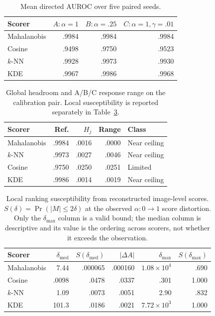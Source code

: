 \documentclass[pdflatex,sn-basic]{sn-jnl}
\theoremstyle{plain}
\theoremstyle{definition}
\theoremstyle{remark}
\begin{document}
\begin{table}[t]
\centering
\caption{Mean directed AUROC over five paired seeds.}
\label{tab:rq3}
\small
\begin{tabular}{lrrr}
\toprule
Scorer & $A:\alpha=1$ & $B:\alpha=.25$ & $C:\alpha=1,\gamma=.01$\\
\midrule
Mahalanobis & .9984 & .9984 & .9984\\
Cosine & .9498 & .9750 & .9523\\
$k$-NN & .9928 & .9973 & .9930\\
KDE & .9967 & .9986 & .9968\\
\bottomrule
\end{tabular}
\end{table}

\begin{table}[t]
\centering
\caption{Global headroom and A/B/C response range on the calibration pair. Local susceptibility is reported separately in Table~\ref{tab:susceptibility}.}
\label{tab:headroom}
\small
\begin{tabular}{lrrrl}
\toprule
Scorer & Ref. & $H_j$ & Range & Class\\
\midrule
Mahalanobis & .9984 & .0016 & .0000 & Near ceiling\\
$k$-NN & .9973 & .0027 & .0046 & Near ceiling\\
Cosine & .9750 & .0250 & .0251 & Limited\\
KDE & .9986 & .0014 & .0019 & Near ceiling\\
\bottomrule
\end{tabular}
\end{table}

\begin{table}[t]
\centering
\caption{Local ranking susceptibility from reconstructed image-level scores. $S(\delta)=\Pr(|M|\le2\delta)$ at the observed $\alpha\!:\!0\!\to\!1$ score distortion. Only the $\delta_{\max}$ column is a valid bound; the median column is descriptive and its value is the ordering across scorers, not whether it exceeds the observation.}
\label{tab:susceptibility}
\small
\begin{tabular}{lrrrrr}
\toprule
Scorer & $\delta_{\mathrm{med}}$ & $S(\delta_{\mathrm{med}})$ & $|\Delta A|$ & $\delta_{\max}$ & $S(\delta_{\max})$\\
\midrule
Mahalanobis & 7.44 & .000065 & .000160 & $1.08{\times}10^{4}$ & .690\\
Cosine & .0098 & .0478 & .0337 & .301 & 1.000\\
$k$-NN & 1.09 & .0073 & .0051 & 2.90 & .832\\
KDE & 101.3 & .0186 & .0021 & $7.72{\times}10^{3}$ & 1.000\\
\bottomrule
\end{tabular}
\end{table}
\end{document}
